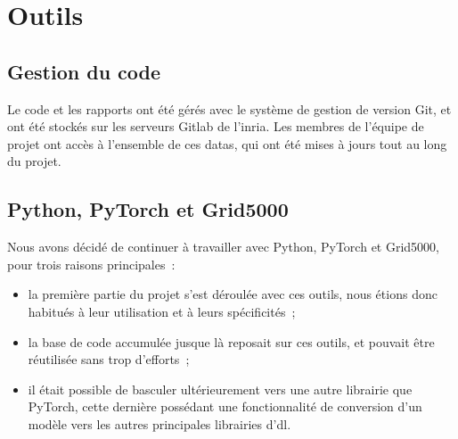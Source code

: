 \section{Outils}
\subsection{Gestion du code}
Le code et les rapports ont été gérés avec le système de gestion de version Git, et ont été stockés sur les serveurs Gitlab de l'\gls{inria}. Les membres de l'équipe de projet ont accès à l'ensemble de ces \glspl{data}, qui ont été mises à jours tout au long du projet.

\subsection{Python, PyTorch et Grid5000}
Nous avons décidé de continuer à travailler avec Python, PyTorch et Grid5000, pour trois raisons principales~:
\begin{itemize}
	\item la première partie du projet s'est déroulée avec ces outils, nous étions donc habitués à leur utilisation et à leurs spécificités~;
	\item la base de code accumulée jusque là reposait sur ces outils, et pouvait être réutilisée sans trop d'efforts~;
	\item il était possible de basculer ultérieurement vers une autre librairie que  PyTorch, cette dernière possédant une fonctionnalité de conversion d'un modèle vers les autres principales librairies d'\gls{dl}.
\end{itemize}